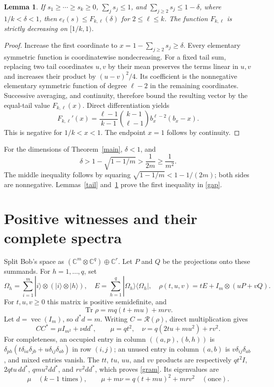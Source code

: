 \documentclass[11pt]{article}
\newtheorem{lemma}[theorem]{Lemma}
\newcommand{\tr}{\operatorname{Tr}}
\newcommand{\R}{\mathcal R}
\newcommand{\e}{e}
\newcommand{\F}{F_{k,\ell}}
\begin{document}
\begin{lemma}\label{scalar}
If $s_1\ge\cdots\ge s_k\ge0$, $\sum_j s_j\le1$, and
$\sum_{j\ge2}s_j\le1-\delta$, where $1/k<\delta<1$, then
$\e_\ell(s)\le\F(\delta)$ for $2\le\ell\le k$.
The function $\F$ is strictly decreasing on $[1/k,1)$.
\end{lemma}
\begin{proof}
Increase the first coordinate to $x=1-\sum_{j\ge2}s_j\ge\delta$.
Every elementary symmetric function is coordinatewise nondecreasing.
For a fixed tail sum, replacing two tail coordinates $u,v$ by their mean
preserves the terms linear in $u,v$ and increases their product by
$(u-v)^2/4$. Its coefficient is the nonnegative elementary symmetric
function of degree $\ell-2$ in the remaining coordinates. Successive
averaging, and continuity, therefore bound the resulting vector by the
equal-tail value $\F(x)$. Direct differentiation yields
\[
 \F'(x)=\frac{\ell-1}{k-1}\binom{k-1}{\ell-1}
 b_x^{\ell-2}(b_x-x).
\]
This is negative for $1/k<x<1$. The endpoint $x=1$ follows by continuity.
\end{proof}

For the dimensions of Theorem~\ref{main}, $\delta<1$, and
\begin{equation}\label{delta-half}
 \delta>1-\sqrt{1-1/m}>\frac1{2m}\ge\frac1{m^2}.
\end{equation}
The middle inequality follows by squaring
$\sqrt{1-1/m}<1-1/(2m)$; both sides are nonnegative.
Lemmas~\ref{tail} and~\ref{scalar} prove the first inequality in
\eqref{gap}.

\section{Positive witnesses and their complete spectra}
Split Bob's space as $(\mathbb C^m\otimes\mathbb C^q)\oplus\mathbb C^r$.
Let $P$ and $Q$ be the projections onto these summands. For
$h=1,\ldots,q$, set
\[
 \Omega_h=\sum_{i=1}^m |i\rangle\otimes(|i\rangle\otimes|h\rangle),
 \quad E=\sum_{h=1}^q|\Omega_h\rangle\langle\Omega_h|,
 \quad \rho(t,u,v)=tE+I_m\otimes(uP+vQ).
\]
For $t,u,v\ge0$ this matrix is positive semidefinite, and
\begin{equation}\label{trace}
 \tr\rho=mq(t+mu)+mr v.
\end{equation}
Let $d=\operatorname{vec}(I_m)$, so $d^*d=m$. Writing
$C=\R(\rho)$, direct multiplication gives
\begin{equation}\label{gram}
 CC^*=\mu I_{m^2}+\nu dd^*,\qquad
 \mu=qt^2,\quad \nu=q(2tu+mu^2)+rv^2.
\end{equation}
For completeness, an occupied entry in column $((a,p),(b,h))$ is
$\delta_{ph}(t\delta_{ia}\delta_{jb}
+u\delta_{ij}\delta_{ab})$ in row $(i,j)$; an unused entry in column
$(a,b)$ is $v\delta_{ij}\delta_{ab}$, and mixed entries vanish.
The $tt$, $tu$, $uu$, and $vv$ products are respectively
$qt^2I$, $2qtu\,dd^*$, $qmu^2dd^*$, and $rv^2dd^*$,
which proves \eqref{gram}. Its eigenvalues are
\begin{equation}\label{eigen}
 \mu\quad(k-1\text{ times}),\qquad
 \mu+m\nu=q(t+mu)^2+mr v^2\quad(\text{once}).
\end{equation}
\end{document}
